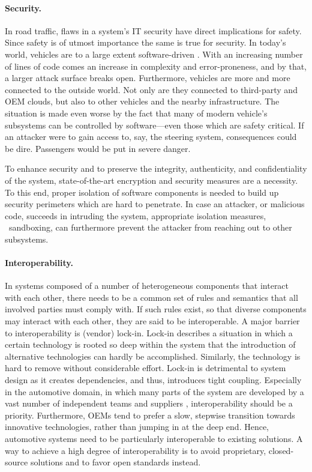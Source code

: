 \paragraph{Security.}
In road traffic, flaws in a system's IT security have direct implications for safety. Since safety is of utmost importance the same is true for security. In today's world, vehicles are to a large extent software-driven \cite{broy2006challenges}. With an increasing number of lines of code comes an increase in complexity and error-proneness, and by that, a larger attack surface breaks open. Furthermore, vehicles are more and more connected to the outside world. Not only are they connected to third-party and OEM clouds, but also to other vehicles and the nearby infrastructure. The situation is made even worse by the fact that many of modern vehicle's subsystems can be controlled by software---even those which are safety critical.	 If an attacker were to gain access to, say, the steering system, consequences could be dire. Passengers would be put in severe danger.

To enhance security and to preserve the integrity, authenticity, and confidentiality of the system, state-of-the-art encryption and security measures are a necessity. To this end, proper isolation of software components is needed to build up security perimeters which are hard to penetrate. In case an attacker, or malicious code, succeeds in intruding the system, appropriate isolation measures, \ie\ sandboxing, can furthermore prevent the attacker from reaching out to other subsystems.

\paragraph{Interoperability.}
In systems composed of a number of heterogeneous components that interact with each other, there needs to be a common set of rules and semantics that all involved parties must comply with. If such rules exist, so that diverse components may interact with each other, they are said to be interoperable.
A major barrier to interoperability is (vendor) lock-in. Lock-in describes a situation in which a certain technology is rooted so deep within the system that the introduction of alternative technologies can hardly be accomplished. Similarly, the technology is hard to remove without considerable effort. Lock-in is detrimental to system design as it creates dependencies, and thus, introduces tight coupling. Especially in the automotive domain, in which many parts of the system are developed by a vast number of independent teams and suppliers \cite{broy2006challenges}, interoperability should be a priority. Furthermore, OEMs tend to prefer a slow, stepwise transition towards innovative technologies, rather than jumping in at the deep end. Hence, automotive systems need to be particularly interoperable to existing solutions. A way to achieve a high degree of interoperability is to avoid proprietary, closed-source solutions and to favor open standards instead.

